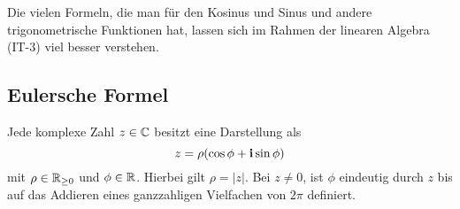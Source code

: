 \begin{bem} 
	Die vielen Formeln, die man für den Kosinus und Sinus und andere trigonometrische Funktionen hat, lassen sich im Rahmen der linearen Algebra (IT-3) viel besser verstehen. 
\end{bem} 

\subsection{Eulersche Formel} 

\begin{thm} \label{thm:z:betr:arg}
	Jede komplexe Zahl $z \in \mathbb{C}$ besitzt eine Darstellung als 
	\[
		z = \rho ( \cos \phi + \mathbf{i} \sin \phi )
	\]
	mit $\rho \in \mathbb{R}_{\ge 0}$ und $\phi \in \mathbb{R}$. Hierbei gilt $\rho = |z|$. Bei $z \ne 0$, ist $\phi$ eindeutig durch $z$ bis auf das Addieren eines ganzzahligen Vielfachen von $2 \pi$ definiert. 
\end{thm}

